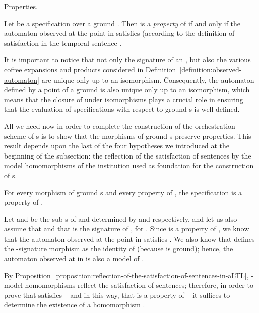 \documentclass{LMCS}
\begin{document}
\begin{minisection}{Properties.}
    \begin{defi}
      Let  be a specification over a ground  .
      Then  is a \emph{property} of  if and only if the automaton  observed at the point  in  satisfies (according to the definition of satisfaction in  the temporal sentence .
      
    \end{defi}

    \begin{rem}
      It is important to notice that not only the signature of an , but also the various cofree expansions and products considered in Definition~\ref{definition:observed-automaton} are unique only up to an isomorphism.  Consequently, the automaton defined by a point of a ground  is also unique only up to an isomorphism, which means that the closure of  under isomorphisms plays a crucial role in ensuring that the evaluation of specifications with respect to ground s is well defined.
    \end{rem}

    All we need now in order to complete the construction of the orchestration scheme of s is to show that the morphisms of ground s preserve properties.
    This result depends upon the last of the four hypotheses we introduced at the beginning of the subsection: the reflection of the satisfaction of sentences by the model homomorphisms of the institution used as foundation for the construction of s.

    \begin{prop}
      \label{orchestration-scheme-of-ARNs}
      For every morphism of ground s  and every property  of , the specification  is a property of .
    \end{prop}

    \proof
    Let  and  be the sub-s of  and  determined by  and  respectively, and let us also assume that  and that  is the signature of , for .
    Since  is a property of , we know that the automaton  observed at the point  in  satisfies .
    We also know that  defines the \nb-signature morphism  as the identity of  (because  is ground); hence, the automaton  observed at  in  is also a model of .

    By Proposition~\ref{proposition:reflection-of-the-satisfaction-of-sentences-in-aLTL}, \nb-model homomorphisms reflect the satisfaction of sentences; therefore, in order to prove that  satisfies  -- and in this way, that  is a property of  -- it suffices to determine the existence of a homomorphism .


\end{minisection}
\end{document}
